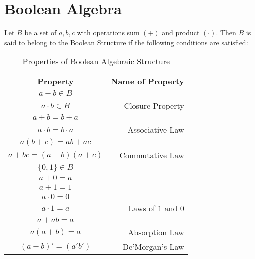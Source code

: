 \large{\chapter{Boolean Algebra}}
Let $B$ be a set of $a,b,c$ with operations sum $(+)$ and product $(\cdot)$.\newline
Then $B$ is said to belong to the Boolean Structure if the following conditions are satisfied:
\begin{table}[H]
	\caption{Properties of Boolean Algebraic Structure}
	\label{boolean}
	\begin{center}
		\begin{tabular}{c|r}
			Property&Name of Property\\
			\hline
			$a+b \in B$\\$a \cdot b \in B$&Closure Property\\
			\hline
			$a+b=b+a$\\
			$a \cdot b= b \cdot a$&Associative Law\\
			\hline
			$a(b+c) = ab + ac $\\
			$a+bc=(a+b)(a+c)$&Commutative Law\\
			\hline
			$\lbrace 0,1 \rbrace \in B$\\
			$a+0=a$\\
			$a+1=1$\\
			$a \cdot 0=0$\\
			$a \cdot 1=a$&Laws of $1$ and $0$\\
			\hline
			$a+ab=a$\\
			$a(a+b)=a$&Absorption Law\\
			\hline
			$(a+b)'=(a'b')$&De'Morgan's Law
		\end{tabular}
	\end{center}
\end{table}
